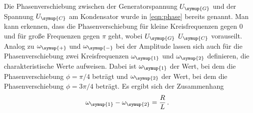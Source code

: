 Die Phasenverschiebung zwischen der Generatorspannung $U_{\symup{G}}$ und der
Spannung $U_{\symup{C}}$ am Kondensator wurde in \eqref{eqn:phase} bereits genannt.
Man kann erkennen, dass die Phasenverschiebung für kleine Kreisfrequenzen gegen
$0$ und für große Frequenzen gegen $\pi$ geht, wobei $U_{\symup{G}}$ $U_{\symup{C}}$
vorauseilt. Analog zu $\omega_{\symup{+}}$ und $\omega_{\symup{-}}$ bei der Amplitude
lassen sich auch für die Phasenverschiebung zwei Kreisfrequenzen $\omega_{\symup{1}}$
und $\omega_{\symup{2}}$ definieren, die charakteristische Werte aufweisen. Dabei
ist $\omega_{\symup{1}}$ der Wert, bei dem die Phasenverschiebung $\phi=\pi/4$ beträgt
und $\omega_{\symup{2}}$ der Wert, bei dem die Phasenverschiebung $\phi=3\pi/4$ beträgt.
Es ergibt sich der Zusammenhang
\begin{equation}
  \omega_{\symup{1}}-\omega_{\symup{2}}=\frac{R}{L}\,.
\end{equation}
